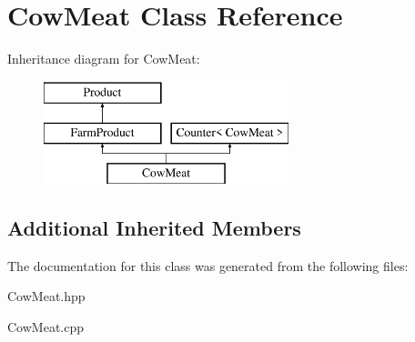 \hypertarget{class_cow_meat}{}\section{Cow\+Meat Class Reference}
\label{class_cow_meat}
Inheritance diagram for Cow\+Meat\+:\begin{figure}[H]
\begin{center}
\leavevmode
\includegraphics[height=3.000000cm]{class_cow_meat}
\end{center}
\end{figure}
\subsection*{Additional Inherited Members}


The documentation for this class was generated from the following files\+:\begin{DoxyCompactItemize}
\item 
Cow\+Meat.\+hpp\item 
Cow\+Meat.\+cpp\end{DoxyCompactItemize}
